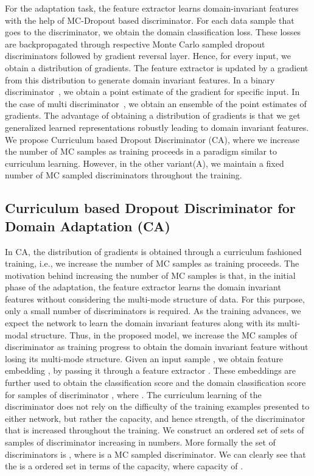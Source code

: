 \documentclass{bmvc2k}
\begin{document}
For the adaptation task, the feature extractor learns domain-invariant features with the help of MC-Dropout based discriminator. For each data sample that goes to the discriminator, we obtain the domain classification loss. These losses are backpropagated through respective Monte Carlo sampled dropout discriminators followed by gradient reversal layer. Hence, for every input, we obtain a distribution of gradients. The feature extractor is updated by a gradient from this distribution to generate domain invariant features. In a binary discriminator~\cite{ganin_ICML2015}, we obtain a point estimate of the gradient for specific input. In the case of multi discriminator~\cite{pei_arxiv2018}, we obtain an ensemble of the point estimates of gradients. The advantage of obtaining a distribution of gradients is that we get generalized learned representations robustly leading to domain invariant features. We propose Curriculum based Dropout Discriminator (CA), where we increase the number of MC samples as training proceeds in a paradigm similar to curriculum learning. However, in the other variant(A), we maintain a fixed number of MC sampled discriminators throughout the training.
\vspace{-1.45em}
\subsection{Curriculum based Dropout Discriminator for Domain Adaptation (CA)}
 In CA, the distribution of gradients is obtained through a curriculum fashioned training, i.e., we increase the number of MC samples as training proceeds. The motivation behind increasing the number of MC samples is that, in the initial phase of the adaptation, the feature extractor learns the domain invariant features without considering the multi-mode structure of data. For this purpose, only a small number of discriminators is required. As the training advances, we expect the network to learn the domain invariant features along with its multi-modal structure. Thus, in the proposed model, we increase the MC samples of discriminator as training progress to obtain the domain invariant feature without losing its multi-mode structure. 
Given an input sample , we obtain feature embedding , by passing it through a feature extractor . These embeddings are further used to obtain the classification score  and the domain classification score for  samples of discriminator , where .
The curriculum learning of the discriminator does not rely on the difficulty of the training examples presented to either network, but rather the capacity, and hence strength, of the discriminator that is increased throughout the training. We construct an ordered set of sets of samples of discriminator increasing in numbers. More formally the set of discriminators is
, where  is a MC sampled discriminator. We can clearly see that the  is a ordered set in terms of the capacity, where capacity of .
\vspace{-1em}
\end{document}
